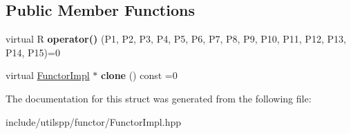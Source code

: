 \subsection*{Public Member Functions}
\begin{DoxyCompactItemize}
\item 
\hypertarget{structutilspp_1_1FunctorImpl_3_01R_00_01TYPE__LIST__15_07P1_00_01P2_00_01P3_00_01P4_00_01P5_00_03f6bfb72f2977866a35a5dbc6e440ab4_ac4a0898f96f5b288e1993b64bef6c431}{virtual R {\bfseries operator()} (P1, P2, P3, P4, P5, P6, P7, P8, P9, P10, P11, P12, P13, P14, P15)=0}\label{structutilspp_1_1FunctorImpl_3_01R_00_01TYPE__LIST__15_07P1_00_01P2_00_01P3_00_01P4_00_01P5_00_03f6bfb72f2977866a35a5dbc6e440ab4_ac4a0898f96f5b288e1993b64bef6c431}

\item 
\hypertarget{structutilspp_1_1FunctorImpl_3_01R_00_01TYPE__LIST__15_07P1_00_01P2_00_01P3_00_01P4_00_01P5_00_03f6bfb72f2977866a35a5dbc6e440ab4_a3f0a230f65762069b13c4cb18921f419}{virtual \hyperlink{structutilspp_1_1FunctorImpl}{Functor\-Impl} $\ast$ {\bfseries clone} () const =0}\label{structutilspp_1_1FunctorImpl_3_01R_00_01TYPE__LIST__15_07P1_00_01P2_00_01P3_00_01P4_00_01P5_00_03f6bfb72f2977866a35a5dbc6e440ab4_a3f0a230f65762069b13c4cb18921f419}

\end{DoxyCompactItemize}


The documentation for this struct was generated from the following file\-:\begin{DoxyCompactItemize}
\item 
include/utilspp/functor/Functor\-Impl.\-hpp\end{DoxyCompactItemize}
